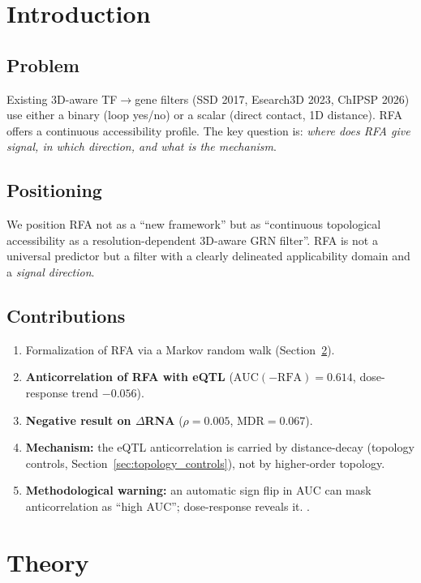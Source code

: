 \documentclass[11pt,a4paper]{article}
\begin{document}
\section{Introduction}

\subsection{Problem}
Existing 3D-aware TF$\rightarrow$gene filters (SSD 2017, Esearch3D 2023, ChIPSP 2026) use either a binary (loop yes/no) or a scalar (direct contact, 1D distance). RFA offers a continuous accessibility profile. The key question is: \emph{where does RFA give signal, in which direction, and what is the mechanism}.

\subsection{Positioning}
We position RFA not as a ``new framework'' but as ``continuous topological accessibility as a resolution-dependent 3D-aware GRN filter''. RFA is not a universal predictor but a filter with a clearly delineated applicability domain and a \emph{signal direction}.

\subsection{Contributions}
\begin{enumerate}
    \item Formalization of RFA via a Markov random walk (Section~\ref{sec:theory}).
    \item \textbf{Anticorrelation of RFA with eQTL} ($\mathrm{AUC}(-\mathrm{RFA})=0.614$, dose-response trend $-0.056$).
    \item \textbf{Negative result on $\Delta$RNA} ($\rho=0.005$, MDR$=0.067$).
    \item \textbf{Mechanism:} the eQTL anticorrelation is carried by distance-decay (topology controls, Section~\ref{sec:topology_controls}), not by higher-order topology.
    \item \textbf{Methodological warning:} an automatic sign flip in AUC can mask anticorrelation as ``high AUC''; dose-response reveals it.
.
\end{enumerate}

\section{Theory}\label{sec:theory}
\end{document}
